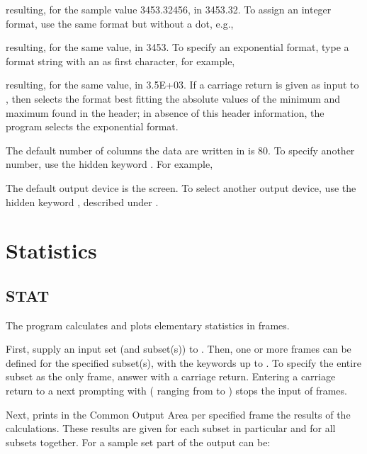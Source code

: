 
resulting, for the sample value 3453.32456, in 3453.32.  To assign an
integer format, use the same format but without a dot, e.g.,


resulting, for the same value, in 3453.  To specify an exponential
format, type a format string with an  as first character, for
example,


resulting, for the same value, in 3.5E+03.  If a carriage return is
given as input to , then  selects the
format best fitting the absolute values of the minimum and maximum found
in the header; in absence of this header information, the program
selects the exponential format. 

The default number of columns the data are written in is 80.  To specify
another number, use the hidden keyword .  For example,


The default output device is the screen.  To select another output
device, use the hidden keyword , described under
. 

\section{Statistics}


\subsection*{STAT}

The program  calculates and plots elementary statistics in
frames.

First, supply an input set (and subset(s)) to .  Then,
one or more frames can be defined for the specified subset(s), with the
keywords  up to .  To specify the entire
subset as the only frame, answer  with a carriage
return.  Entering a carriage return to a next prompting with
 (\keyword{*} ranging from  to )
stops the input of frames. 

Next,  prints in the Common Output Area per specified
frame the results of the calculations.  These results are given for each
subset in particular and for all subsets together.  For a sample set
part of the output can be:

